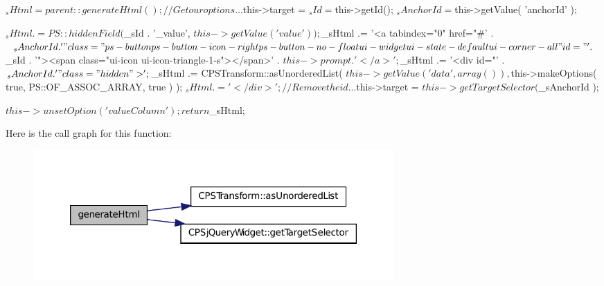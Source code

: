 \begin{DoxyCode}
    {
        $_sHtml = parent::generateHtml();
        
        //  Get our options...
        $this->target = $_sId = $this->getId();
        $_sAnchorId = $this->getValue( 'anchorId' );
        
        $_sHtml .= PS::hiddenField( $_sId . '_value', $this->getValue( 'value' ) 
      );
        $_sHtml .= '<a tabindex="0" href="#' . $_sAnchorId . '" class="ps-button 
      ps-button-icon-right ps-button-no-float ui-widget ui-state-default ui-corner-all"
       id="' . $_sId . '"><span class="ui-icon ui-icon-triangle-1-s"></span>' . $this->
      prompt . '</a>';
        $_sHtml .= '<div id="' . $_sAnchorId . '" class="hidden">';
        $_sHtml .= CPSTransform::asUnorderedList( $this->getValue( 'data', array(
      ) ), $this->makeOptions( true, PS::OF_ASSOC_ARRAY, true ) );
        $_sHtml .= '</div>';
        
        //  Remove the id...
        $this->target = $this->getTargetSelector( $_sAnchorId );
        
        $this->unsetOption('valueColumn');
        
        return $_sHtml;
    }
\end{DoxyCode}




Here is the call graph for this function:\nopagebreak
\begin{figure}[H]
\begin{center}
\leavevmode
\includegraphics[width=390pt]{classCPSfgMenu_acc5a32d52db57b80885add51c076ed42_cgraph}
\end{center}
\end{figure}


